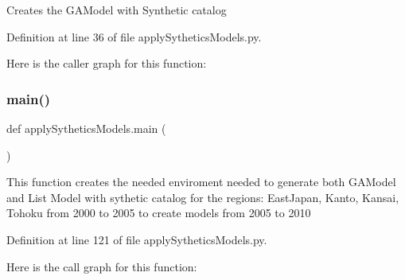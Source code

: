 \begin{DoxyVerb}Creates the GAModel with Synthetic catalog
\end{DoxyVerb}
 

Definition at line 36 of file apply\+Sythetics\+Models.\+py.

Here is the caller graph for this function\+:
\mbox{\label{namespaceapply_sythetics_models_a17a91bec336ba8029a108e10c5c2fe56}} 
\subsubsection{\texorpdfstring{main()}{main()}}
{\footnotesize\ttfamily def apply\+Sythetics\+Models.\+main (\begin{DoxyParamCaption}{ }\end{DoxyParamCaption})}

\begin{DoxyVerb}This function creates the needed enviroment needed to generate both GAModel and List Model  with sythetic catalog
for the regions: EastJapan, Kanto, Kansai, Tohoku
from 2000 to 2005 to create models from 2005 to 2010
\end{DoxyVerb}
 

Definition at line 121 of file apply\+Sythetics\+Models.\+py.

Here is the call graph for this function\+:
